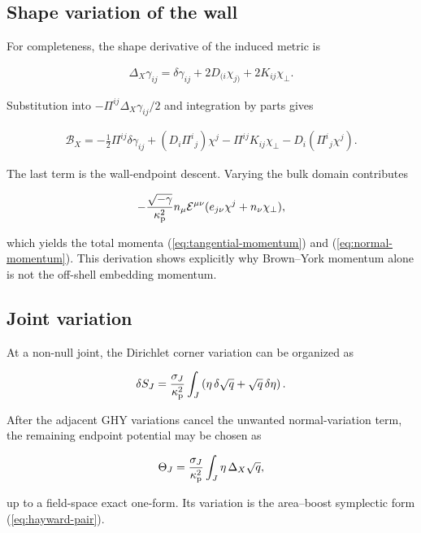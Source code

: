 \subsection{Shape variation of the wall}

For completeness, the shape derivative of the induced metric is

\begin{align}
\Delta_X\gamma_{ij}
=\delta\gamma_{ij}
+2D_{(i}\chi_{j)}+2K_{ij}\chi_\perp .
\end{align}

Substitution into $-\Pi^{ij}\Delta_X\gamma_{ij}/2$ and integration by parts gives

\begin{align}
\mathcal B_X
=-\frac12\Pi^{ij}\delta\gamma_{ij}
+(D_i\Pi^i{}_j)\chi^j
-\Pi^{ij}K_{ij}\chi_\perp
-D_i(\Pi^i{}_j\chi^j).
\end{align}

The last term is the wall-endpoint descent. Varying the bulk domain contributes

\begin{align}
-\frac{\sqrt{-\gamma}}{\kappa_{\rm p}^{2}}
n_\mu\mathcal E^{\mu\nu}
(e_{j\nu}\chi^j+n_\nu\chi_\perp),
\end{align}

which yields the total momenta (\ref{eq:tangential-momentum}) and (\ref{eq:normal-momentum}). This derivation shows explicitly why Brown--York momentum alone is not the off-shell embedding momentum.

\subsection{Joint variation}

At a non-null joint, the Dirichlet corner variation can be organized as

\begin{align}
\delta S_J
=\frac{\sigma_J}{\kappa_{\rm p}^{2}}
\int_J\left(\eta\,\delta\sqrt q+\sqrt q\,\delta\eta\right).
\end{align}

After the adjacent GHY variations cancel the unwanted normal-variation term, the remaining endpoint potential may be chosen as

\begin{align}
\Theta_J
=\frac{\sigma_J}{\kappa_{\rm p}^{2}}
\int_J\eta\,\Delta_X\sqrt q,
\end{align}

up to a field-space exact one-form. Its variation is the area--boost symplectic form (\ref{eq:hayward-pair}).
